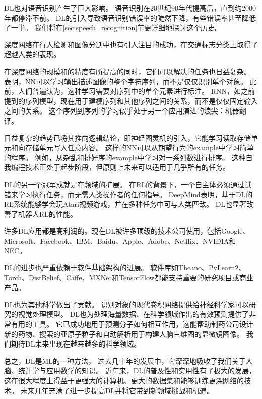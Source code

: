 
\gls{DL}也对语音识别产生了巨大影响。
语音识别在20世纪90年代提高后，直到约2000年都停滞不前。
\gls{DL}的引入\citep{dahl2010phonerec,Deng-2010,Seide2011,Hinton-et-al-2012}导致语音识别错误率的陡然下降，有些错误率甚至降低了一半。 
我们将在\ref{sec:speech_recognition}节更详细地探讨这个历史。

深度网络在行人检测和图像分割中也有引人注目的成功\citep{sermanet-cvpr-13,Farabet-et-al-2013,couprie-iclr-13}，在交通标志分类上取得了超越人类的表现\citep{Ciresan-et-al-2012}。

在深度网络的规模和的精度有所提高的同时，它们可以解决的任务也日益复杂。
\citet{Goodfellow+et+al-ICLR2014a}表明，\gls{NN}可以学习输出描述图像的整个字符序列，而不是仅仅识别单个对象。
此前，人们普遍认为，这种学习需要对序列中的单个元素进行标注\citep{Gulcehre+Bengio-arxiv-2013}。
\gls{RNN}，如之前提到的序列模型，现在用于建模序列和其他序列之间的关系，而不是仅仅固定输入之间的关系。
这个序列到序列的学习似乎处于另一个应用演进的浪尖：机器翻译\citep{Sutskever-et-al-NIPS2014,Bahdanau-et-al-ICLR2015-small}。


日益复杂的趋势已将其推向逻辑结论，即神经图灵机\citep{Graves-et-al-arxiv2014}的引入，它能学习读取存储单元和向存储单元写入任意内容。
这样的\gls{NN}可以从期望行为的\gls{example}中学习简单的程序。
例如，从杂乱和排好序的\gls{example}中学习对一系列数进行排序。
这种自我编程技术正处于起步阶段，但原则上未来可以适用于几乎所有的任务。


\gls{DL}的另一个冠军成就是在领域的扩展。
在\gls{RL}的背景下，一个自主体必须通过试错来学习执行任务，而无需人类操作者的任何指导。
DeepMind表明，基于\gls{DL}的\gls{RL}系统能够学会玩Atari视频游戏，并在多种任务中可与人类匹敌\citep{Mnih-et-al-2015}。
\gls{DL}也显著改善了机器人\gls{RL}的性能\citep{finn2015learning}。

许多\gls{DL}应用都是高利润的。现在\gls{DL}被许多顶级的技术公司使用，包括Google、Microsoft、Facebook、IBM、Baidu、Apple、Adobe、Netflix、NVIDIA和NEC。

\gls{DL}的进步也严重依赖于软件基础架构的进展。
软件库如Theano\citep{bergstra+al:2010-scipy,Bastien-2012}、PyLearn2\citep{pylearn2_arxiv_2013}、Torch\citep{Torch-2011}、DistBelief\citep{Dean-et-al-NIPS2012}、Caffe\citep{Jia13caffe}、MXNet\citep{chen2015mxnet}和TensorFlow\citep{tensorflow}都能支持重要的研究项目或商业产品。

\gls{DL}也为其他科学做出了贡献。
识别对象的现代卷积网络提供给神经科学家可以研究的视觉处理模型\citep{dicarlo-tutorial-2013}。
\gls{DL}也为处理海量数据、在科学领域作出的有效预测提供了非常有用的工具。
它已成功地用于预测分子如何相互作用，这能帮助制药公司设计新的药物\citep{Dahl-et-al-arxiv2014}、搜索的亚原子粒子\citep{baldi2014searching}和自动解析用于构建人脑三维图的显微镜图像\citep{knowlesdeep}。
我们期待\gls{DL}未来出现在越来越多的科学领域。


总之，\gls{DL}是\gls{ML}的一种方法， 过去几十年的发展中，它深深地吸收了我们关于人脑、统计学与应用数学的知识。
近年来，\gls{DL}的普及性和实用性有了极大的发展，这在很大程度上得益于更强大的计算机、更大的数据集和能够训练更深网络的技术。
未来几年充满了进一步提高\gls{DL}并将它带到新领域挑战和机遇。

